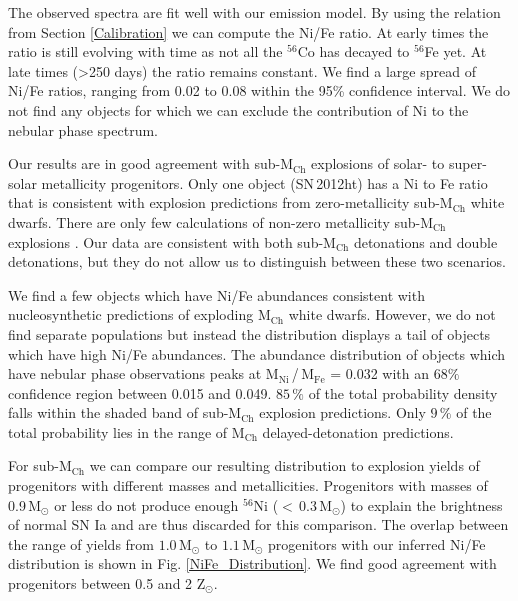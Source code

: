 \documentclass[fleqn,usenatbib]{mnras}
\begin{document}
The observed spectra are fit well with our emission model. By using the relation from Section \ref{Calibration} we can compute the Ni/Fe ratio. At early times the ratio is still evolving with time as not all the $^{56}$Co has decayed to $^{56}$Fe yet. At late times (>250 days) the ratio remains constant. We find a large spread of Ni/Fe ratios, ranging from 0.02 to 0.08 within the 95\% confidence interval. We do not find any objects for which we can exclude the contribution of Ni to the nebular phase spectrum. 

Our results are in good agreement with sub-M$_{\text{Ch}}$ explosions of solar- to super-solar metallicity progenitors. Only one object (SN\,2012ht) has a Ni to Fe ratio that is consistent with explosion predictions from zero-metallicity sub-M$_{\text{Ch}}$ white dwarfs. There are only few calculations of non-zero metallicity sub-M$_{\text{Ch}}$ explosions \citep{2010ApJ...714L..52S, 2018ApJ...854...52S}. Our data are consistent with both sub-M$_{\text{Ch}}$ detonations and double detonations, but they do not allow us to distinguish between these two scenarios. 

We find a few objects which have Ni/Fe abundances consistent with nucleosynthetic predictions of exploding M$_{\text{Ch}}$ white dwarfs. However, we do not find separate populations but instead the distribution displays a tail of objects which have high Ni/Fe abundances. The abundance distribution of objects which have nebular phase observations peaks at M$_{\text{Ni}}$\,/\,M$_{\text{Fe}}$ = 0.032 with an $68\%$ confidence region between 0.015 and 0.049. $85\,\%$ of the total probability density falls within the shaded band of sub-M$_{\text{Ch}}$ explosion predictions. Only $9\,\%$ of the total probability lies in the range of M$_{\text{Ch}}$ delayed-detonation predictions. 

For sub-M$_{\text{Ch}}$ we can compare our resulting distribution to explosion yields of progenitors with different masses and metallicities. Progenitors with masses of 0.9\,M$_\odot$ or less do not produce enough $^{56}$Ni ($<\,0.3\,$M$_\odot$) to explain the brightness of normal SN Ia and are thus discarded for this comparison. The overlap between the range of yields from $1.0\,$M$_\odot$ to $1.1\,$M$_\odot$ progenitors with our inferred Ni/Fe distribution is shown in Fig. \ref{NiFe_Distribution}. We find good agreement with progenitors between 0.5 and 2 Z$_\odot$. 

\end{document}
